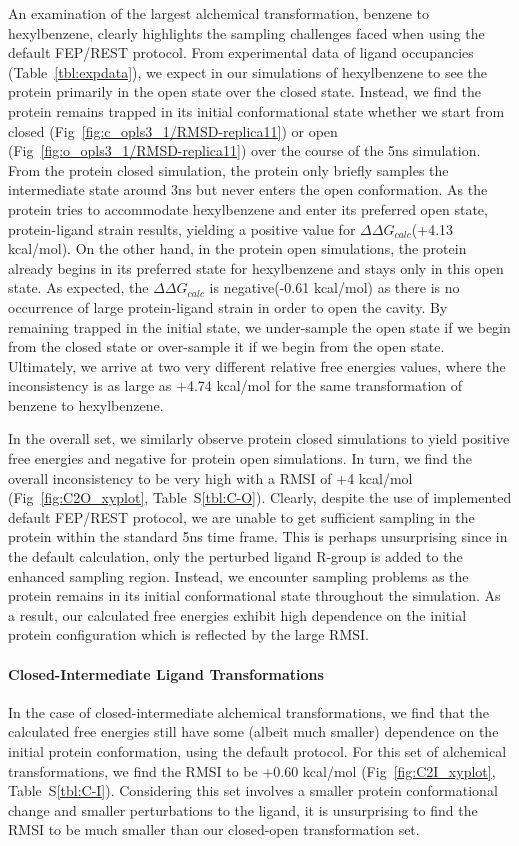 An examination of the largest alchemical transformation, benzene to hexylbenzene, clearly highlights the sampling challenges faced when using the default FEP/REST protocol.
From experimental data of ligand occupancies (Table~\ref{tbl:expdata}), we expect in our simulations of hexylbenzene to see the protein primarily in the open state over the closed state.
Instead, we find the protein remains trapped in its initial conformational state whether we start from closed (Fig~\ref{fig:c_opls3_1/RMSD-replica11}) or open (Fig~\ref{fig:o_opls3_1/RMSD-replica11}) over the course of the 5ns simulation.
From the protein closed simulation, the protein only briefly samples the intermediate state around 3ns but never enters the open conformation.
As the protein tries to accommodate hexylbenzene and enter its preferred open state, protein-ligand strain results, yielding a positive value for $\Delta\Delta G_{calc}$(+4.13 kcal/mol).
On the other hand, in the protein open simulations, the protein already begins in its preferred state for hexylbenzene and stays only in this open state.
As expected, the $\Delta\Delta G_{calc}$ is negative(-0.61 kcal/mol) as there is no occurrence of large protein-ligand strain in order to open the cavity.
By remaining trapped in the initial state, we under-sample the open state if we begin from the closed state or over-sample it if we begin from the open state.
Ultimately, we arrive at two very different relative free energies values, where the inconsistency is as large as +4.74 kcal/mol for the same transformation of benzene to hexylbenzene.

In the overall set, we similarly observe protein closed simulations to yield positive free energies and negative for protein open simulations.
In turn, we find the overall inconsistency to be very high with a RMSI of +4 kcal/mol (Fig~\ref{fig:C2O_xyplot}, Table~S\ref{tbl:C-O}).
Clearly, despite the use of implemented default FEP/REST protocol, we are unable to get sufficient sampling in the protein within the standard 5ns time frame.
This is perhaps unsurprising since in the default calculation, only the perturbed ligand R-group is added to the enhanced sampling region.
Instead, we encounter sampling problems as the protein remains in its initial conformational state throughout the simulation.
As a result, our calculated free energies exhibit high dependence on the initial protein configuration which is reflected by the large RMSI.

\paragraph{Closed-Intermediate Ligand Transformations}
In the case of closed-intermediate alchemical transformations, we find that the calculated free energies still have some (albeit much smaller) dependence on the initial protein conformation, using the default protocol.
For this set of alchemical transformations, we find the RMSI to be +0.60 kcal/mol (Fig~\ref{fig:C2I_xyplot}, Table~S\ref{tbl:C-I}).
Considering this set involves a smaller protein conformational change and smaller perturbations to the ligand, it is unsurprising to find the RMSI to be much smaller than our closed-open transformation set.


